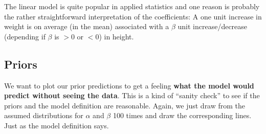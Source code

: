 \documentclass[
]{book}
\begin{document}
The linear model is quite popular in applied statistics and one
reason is probably the rather straightforward interpretation of the coefficients:
A one unit increase in weight is on average (in the mean) associated with
a \(\beta\) unit increase/decrease (depending if \(\beta\) is \(>0\) or \(<0\)) in height.

\subsection{Priors}\label{priors}

We want to plot our prior predictions to get a feeling \textbf{what
the model would predict without seeing the data}.
This is a kind of ``sanity check'' to see if the priors and
the model definition are reasonable.
Again, we just draw from the assumed distributions for \(\alpha\) and \(\beta\)
100 times and draw the corresponding lines. Just as the model
definition says.
\end{document}
